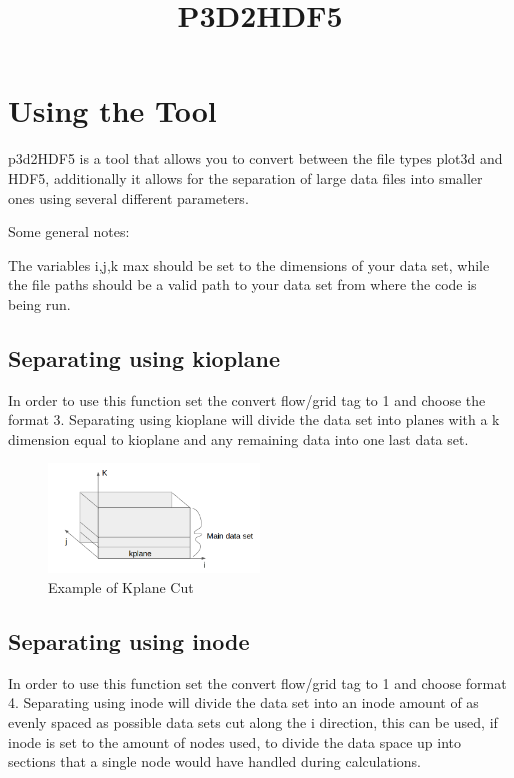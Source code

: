 \documentclass[12pt, oneside]{article}
\title{P3D2HDF5}
\begin{document}
\maketitle

\section{Using the Tool}
p3d2HDF5 is a tool that allows you to convert between the file types plot3d and HDF5, additionally it allows for the separation of large data files
into smaller ones using several different parameters.

Some general notes:

The variables i,j,k max should be set to the dimensions of your data set, while the file paths should be a valid path to your data set from where the code is being run.

\subsection{Separating using kioplane}
In order to use this function set the convert flow/grid tag to 1 and choose the format 3. Separating using kioplane will divide the data set into planes with a k dimension equal 
to kioplane and any remaining data into one last data set.

\begin{figure}[H]
\centering
\includegraphics[width=0.5\textwidth]{FIGS/Kplane.png}

\caption{{\footnotesize Example of Kplane Cut}}
\label{fig: } 
\end{figure}

\subsection{Separating using inode}
In order to use this function set the convert flow/grid tag to 1 and choose format 4. Separating using inode will divide the data set into an inode amount of 
as evenly spaced as possible data sets cut along the i direction, this can be used, if inode is set to the amount of nodes used, 
to divide the data space up into sections that a single node would have handled during calculations.
\end{document}
